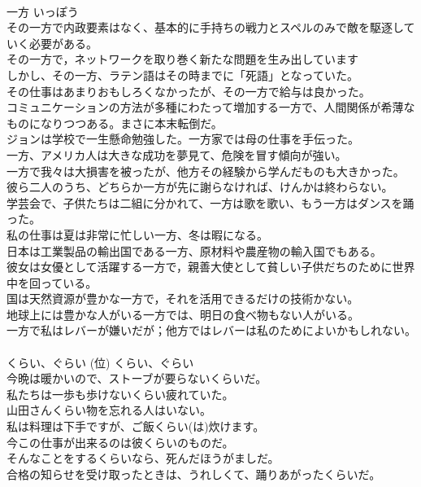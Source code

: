 \documentclass[8pt]{extreport}
\begin{document}
\begin{CJK}{UTF8}{min}
\\	一方	いっぽう	
\\	その一方で内政要素はなく、基本的に手持ちの戦力とスペルのみで敵を駆逐していく必要がある。  
\\	その一方で，ネットワークを取り巻く新たな問題を生み出しています
\\	しかし、その一方、ラテン語はその時までに「死語」となっていた。  
\\	その仕事はあまりおもしろくなかったが、その一方で給与は良かった。  
\\	コミュニケーションの方法が多種にわたって増加する一方で、人間関係が希薄なものになりつつある。まさに本末転倒だ。  
\\	ジョンは学校で一生懸命勉強した。一方家では母の仕事を手伝った。  
\\	一方、アメリカ人は大きな成功を夢見て、危険を冒す傾向が強い。  
\\	一方で我々は大損害を被ったが、他方その経験から学んだものも大きかった。  
\\	彼ら二人のうち、どちらか一方が先に謝らなければ、けんかは終わらない。   
\\	学芸会で、子供たちは二組に分かれて、一方は歌を歌い、もう一方はダンスを踊った。  
\\	私の仕事は夏は非常に忙しい一方、冬は暇になる。  
\\	日本は工業製品の輸出国である一方、原材料や農産物の輸入国でもある。  
\\	彼女は女優として活躍する一方で，親善大使として貧しい子供だちのために世界中を回っている。   
\\	国は天然資源が豊かな一方で，それを活用できるだけの技術かない。  
\\	地球上には豊かな人がいる一方では、明日の食べ物もない人がいる。  
\\	一方で私はレバーが嫌いだが；他方ではレバーは私のためによいかもしれない。   
\\	くらい、ぐらい (位)	くらい、ぐらい	
\\	今晩は暖かいので、ストーブが要らないくらいだ。   
\\	私たちは一歩も歩けないくらい疲れていた。   
\\	山田さんくらい物を忘れる人はいない。  
\\	私は料理は下手ですが、ご飯くらい(は)炊けます。   
\\	今この仕事が出来るのは彼くらいのものだ。   
\\	そんなことをするくらいなら、死んだほうがましだ。  
\\	合格の知らせを受け取ったときは、うれしくて、踊りあがったくらいだ。  

\end{CJK}
\end{document}
